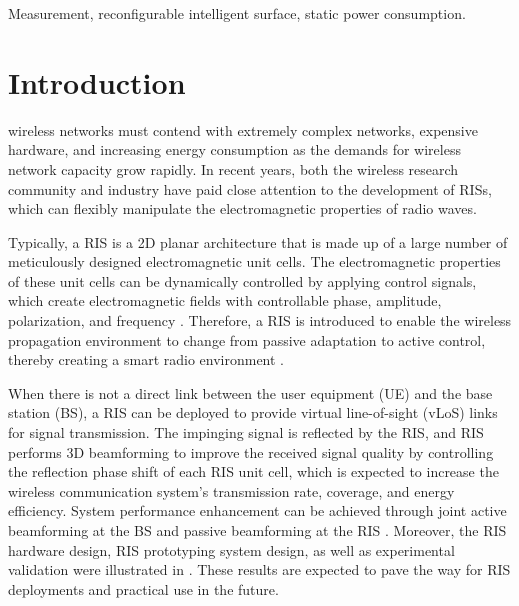 \documentclass[journal]{IEEEtran}
\begin{document}
\begin{IEEEkeywords}
Measurement, reconfigurable intelligent surface, static power consumption.
\end{IEEEkeywords}

\IEEEpeerreviewmaketitle


\section{Introduction}

 wireless networks must contend with extremely complex networks, expensive hardware, and increasing energy consumption as the demands for wireless network capacity grow rapidly. In recent years, both the wireless research community and industry have paid close attention to the development of RISs, which can flexibly manipulate the electromagnetic properties of radio waves.

Typically, a RIS is a 2D planar architecture that is made up of a large number of meticulously designed electromagnetic unit cells. The electromagnetic properties of these unit cells can be dynamically controlled by applying control signals, which create electromagnetic fields with controllable phase, amplitude, polarization, and frequency \cite{cui2014coding,zhang2019breaking}. Therefore, a RIS is introduced to enable the wireless propagation environment to change from passive adaptation to active control, thereby creating a smart radio environment \cite{9140329}. 

When there is not a direct link between the user equipment (UE) and the base station (BS), a RIS can be deployed to provide virtual line-of-sight (vLoS) links for signal transmission. The impinging signal is reflected by the RIS, and RIS performs 3D beamforming to improve the received signal quality by controlling the reflection phase shift of each RIS unit cell, which is expected to increase the wireless communication system's transmission rate, coverage, and energy efficiency. System performance enhancement can be achieved through joint active beamforming at the BS and passive beamforming at the RIS \cite{han2019large,wu2019intelligent,huang2019reconfigurable,guo2020weighted}. Moreover, the RIS hardware design, RIS prototyping system design, as well as experimental validation were illustrated in \cite{tang2020wireless,trichopoulos2022design}. These results are expected to pave the way for RIS deployments and practical use in the future. 
\end{document}
